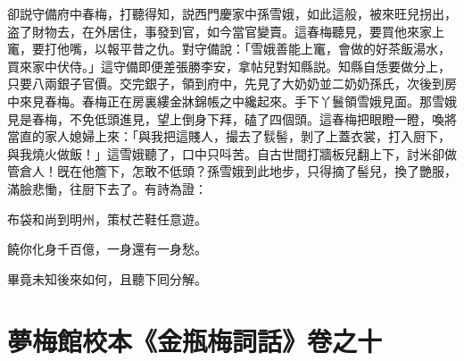 卻説守備府中春梅，打聽得知，説西門慶家中孫雪娥，如此這般，被來旺兒拐出，盗了財物去，在外居住，事發到官，如今當官變賣。這春梅聽見，要買他來家上竃，要打他嘴，以報平昔之仇。對守備說：「雪娥善能上竃，會做的好茶飯湯水，買來家中伏侍。」這守備即便差張勝李安，拿帖兒對知縣説。知縣自恁要做分上，只要八兩銀子官價。交完銀子，領到府中，先見了大奶奶並二奶奶孫氏，次後到房中來見春梅。春梅正在房裏縷金牀錦帳之中纔起來。手下丫鬟領雪娥見面。那雪娥見是春梅，不免低頭進見，望上倒身下拜，磕了四個頭。這春梅把眼瞪一瞪，喚將當直的家人媳婦上來：「與我把這賤人，撮去了䯼髻，剝了上蓋衣裳，打入厨下，與我燒火做飯！」這雪娥聽了，口中只呌苦。自古世間打牆板兒翻上下，討米卻做管倉人！旣在他簷下，怎敢不低頭？孫雪娥到此地步，只得摘了髻兒，換了艷服，滿臉悲慟，往厨下去了。有詩為證：

\begin{myquote}
布袋和尚到明州，策杖芒鞋任意遊。

饒你化身千百億，一身還有一身愁。
\end{myquote}

畢竟未知後來如何，且聽下囘分解。

\part*{夢梅館校本《金瓶梅詞話》卷之十}

